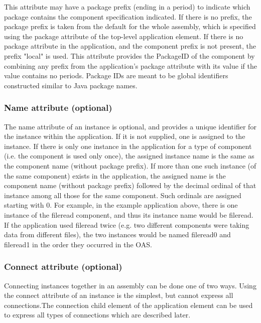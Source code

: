 \documentclass[10pt, a4paper, oneside]{article}
\renewcommand\_{\textunderscore\allowbreak} %
\begin{document}
This attribute may have a package prefix (ending in a period) to indicate which package contains the component specification indicated. If there is no prefix, the package prefix is taken from the default for the whole assembly, which is specified using the package attribute of the top-level application element.  If there is no package attribute in the application, and the component prefix is not present, the prefix "local" is used. This attribute provides the PackageID of the component by combining any prefix from the application's package attribute with its value if the value contains no periods. Package IDs are meant to be global identifiers constructed similar to Java package names.
\subsubsection{Name attribute (optional)}The name attribute of an instance is optional, and provides a unique identifier for the instance within the application. If it is not supplied, one is assigned to the instance. If there is only one instance in the application for a type of component (i.e. the component is used only once), the assigned instance name is the same as the component name (without package prefix). If more than one such instance (of the same component) exists in the application, the assigned name is the component name (without package prefix) followed by the decimal ordinal of that instance among all those for the same component. Such ordinals are assigned starting with 0. 
For example, in the example application above, there is one instance of the file\_read component, and thus its instance name would be file\_read.  If the application used file\_read twice (e.g. two different components were taking data from different files), the two instances would be named file\_read0 and file\_read1 in the order they occurred in the OAS.
\subsubsection {Connect attribute (optional)} Connecting instances together in an assembly can be done one of two ways.  Using the connect attribute of an instance is the simplest, but cannot express all connections.The connection child element of the application element can be used to express all types of connections which are described later.\\
\end{document}
